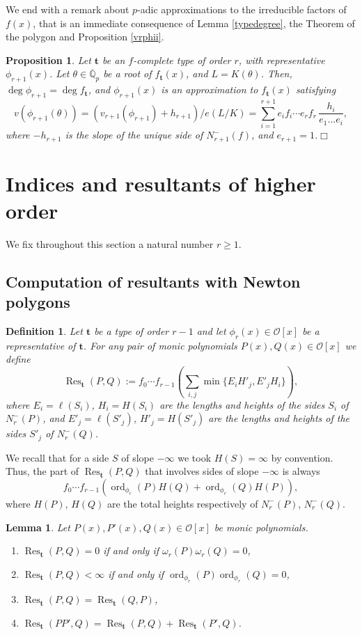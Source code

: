 \documentclass{amsart}
\newtheorem{lemma}[theorem]{Lemma}
\newtheorem{definition}[theorem]{Definition}
\newtheorem{proposition}[theorem]{Proposition}
\def\op{\operatorname}
\def\dg{\op{deg}}
\def\om{\omega}
\def\oo{{\mathcal O}}
\def\ord{\op{ord}}
\def\qpb{\overline{\mathbb{Q}}_p}
\def\res{\op{Res}}
\def\t{\theta}
\def\ty{\mathbf{t}}
\def\zpx{\oo[x]}
\begin{document}
We end with a remark about $p$-adic approximations to the irreducible factors of $f(x)$, that is an immediate consequence of Lemma \ref{typedegree}, the Theorem of the polygon and Proposition \ref{vrphii}.
\begin{proposition}\label{appfactor}
Let $\ty$ be an $f$-complete type of order $r$, with representative $\phi_{r+1}(x)$. Let $\t\in\qpb$ be a root of $f_{\ty}(x)$, and $L=K(\t)$. Then, $\dg \phi_{r+1}=\dg f_{\ty}$, and $\phi_{r+1}(x)$ is an approximation to $f_{\ty}(x)$ satisfying
$$
v(\phi_{r+1}(\t))=(v_{r+1}(\phi_{r+1})+h_{r+1})/e(L/K)=\sum_{i=1}^{r+1}e_if_i\cdots e_rf_r\,\dfrac{h_i}{e_1\dots e_i},
$$where $-h_{r+1}$ is the slope of the unique side of $N_{r+1}^-(f)$, and $e_{r+1}=1$.\hfill{$\Box$}
\end{proposition}
 

\section{Indices and resultants of higher order} 
We fix throughout this section a natural number $r\ge 1$.

\subsection{Computation of resultants with Newton polygons}
\begin{definition}
Let $\ty$ be a type of order $r-1$ and let $\phi_r(x)\in\zpx$ be a representative of $\ty$.  
For any pair of monic polynomials $P(x),Q(x)\in\zpx$ we define
$$
\res_\ty(P,Q):=f_0\cdots f_{r-1}\left(\sum_{i,j}\min\{E_iH'_j,E'_jH_i\}\right),
$$
where $E_i=\ell(S_i)$, $H_i=H(S_i)$ are the lengths and heights of the sides $S_i$ of $N_r^-(P)$, and
$E'_j=\ell(S'_j)$, $H'_j=H(S'_j)$ are the lengths and heights of the sides $S'_j$ of $N_r^-(Q)$. 
\end{definition}

We recall that for a side $S$ of slope $-\infty$ we took $H(S)=\infty$ by convention. Thus, the part of $\res_\ty(P,Q)$ that involves sides of slope $-\infty$ is always 
\begin{equation}\label{resinfinity}
f_0\cdots f_{r-1}(\ord_{\phi_r}(P)H(Q)+\ord_{\phi_r}(Q)H(P)),
\end{equation}
where $H(P)$, $H(Q)$ are the total heights respectively of $N_r^-(P)$, $N_r^-(Q)$.

\begin{lemma}\label{resbilineal}
Let  $P(x),P'(x),Q(x)\in\zpx$ be monic polynomials.
\begin{enumerate}
 \item $\res_\ty(P,Q)=0$ if and only if $\om_r(P)\om_r(Q)=0$,
 \item $\res_\ty(P,Q)<\infty$ if and only if $\ord_{\phi_r}(P)\ord_{\phi_r}(Q)=0$,
 \item $\res_\ty(P,Q)=\res_\ty(Q,P)$,
 \item $\res_\ty(PP',Q)=\res_\ty(P,Q)+\res_\ty(P',Q)$.
\end{enumerate}
\end{lemma}
\end{document}
